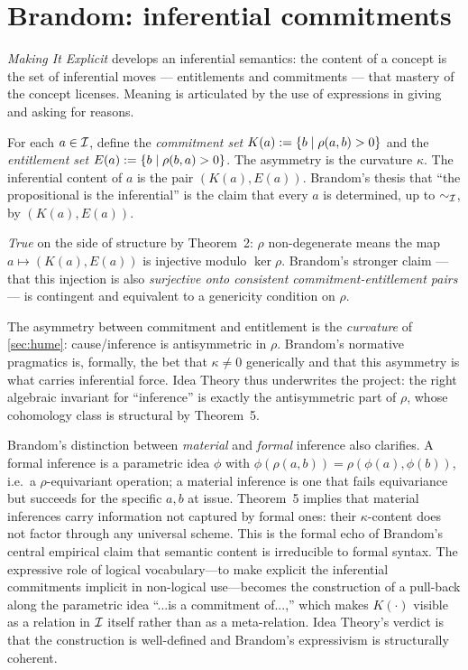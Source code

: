 \section{Brandom: inferential commitments}\label{sec:brandom}

 \emph{Making It Explicit}
\cite{Brandom1994} develops an inferential semantics: the content of a
concept is the set of inferential moves --- entitlements and
commitments --- that mastery of the concept licenses. Meaning is
articulated by the use of expressions in giving and asking for
reasons.

\formalclaim For each $a\in\mathcal{I}$, define the \emph{commitment set}
$K(a) \mathrel{:=} \{ b \mid \rho(a, b) > 0\}$ and the \emph{entitlement
set} $E(a)\mathrel{:=} \{b\mid \rho(b,a)>0\}$. The asymmetry is the
curvature $\kappa$. The inferential content of $a$ is the pair $(K(a),
E(a))$. Brandom's thesis that ``the propositional is the inferential''
is the claim that every $a$ is determined, up to $\sim_{\mathcal{I}}$, by
$(K(a),E(a))$.

\formalstatus \emph{True} on the side of structure by Theorem~2: $\rho$
non-degenerate means the map $a\mapsto (K(a), E(a))$ is injective
modulo $\ker\rho$. Brandom's stronger claim --- that this injection is
also \emph{surjective onto consistent commitment-entitlement pairs} ---
is contingent and equivalent to a genericity condition on $\rho$.

\litcomment The asymmetry between commitment and entitlement is the
\emph{curvature} of \cref{sec:hume}: cause/inference is antisymmetric in
$\rho$. Brandom's normative pragmatics is, formally, the bet that
$\kappa\neq 0$ generically and that this asymmetry is what carries
inferential force. Idea Theory thus underwrites the project: the right
algebraic invariant for ``inference'' is exactly the antisymmetric part
of $\rho$, whose cohomology class is structural by Theorem~5.

Brandom's distinction between \emph{material} and \emph{formal}
inference also clarifies. A formal inference is a parametric idea
$\phi$ with $\phi(\rho(a, b)) = \rho(\phi(a), \phi(b))$, i.e.\ a
$\rho$-equivariant operation; a material inference is one that fails
equivariance but succeeds for the specific $a, b$ at issue. Theorem~5
implies that material inferences carry information not captured by
formal ones: their $\kappa$-content does not factor through any
universal scheme. This is the formal echo of Brandom's central
empirical claim that semantic content is irreducible to formal
syntax. The expressive role of logical vocabulary---to make explicit
the inferential commitments implicit in non-logical use---becomes the
construction of a pull-back along the parametric idea ``...is a
commitment of...,'' which makes $K(\cdot)$ visible as a relation in
$\mathcal{I}$ itself rather than as a meta-relation. Idea Theory's verdict
is that the construction is well-defined and Brandom's expressivism
is structurally coherent.

